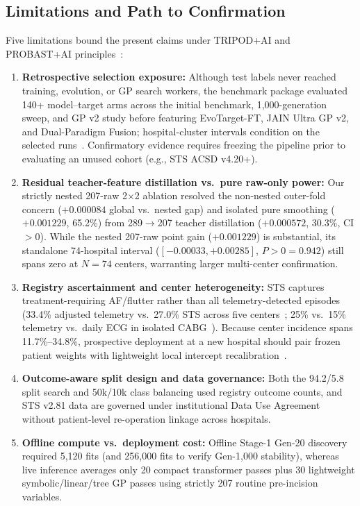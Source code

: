 \subsection{Limitations and Path to Confirmation}
Five limitations bound the present claims under TRIPOD+AI and PROBAST+AI principles~\cite{collins2024tripodai,moons2025probastai}:
\begin{enumerate}
  \item \textbf{Retrospective selection exposure:} Although test labels never reached training, evolution, or GP search workers, the benchmark package evaluated 140+ model--target arms across the initial benchmark, 1,000-generation sweep, and GP v2 study before featuring EvoTarget-FT, JAIN Ultra GP v2, and Dual-Paradigm Fusion; hospital-cluster intervals condition on the selected runs~\cite{dwork2015reusable}. Confirmatory evidence requires freezing the pipeline prior to evaluating an unused cohort (e.g., STS ACSD v4.20+).
  \item \textbf{Residual teacher-feature distillation vs.\ pure raw-only power:} Our strictly nested 207-raw 2$\times$2 ablation resolved the non-nested outer-fold concern ($+0.000084$ global vs.\ nested gap) and isolated pure smoothing ($+0.001229$, 65.2\%) from 289$\to$207 teacher distillation ($+0.000572$, 30.3\%, CI $>0$). While the nested 207-raw point gain ($+0.001229$) is substantial, its standalone 74-hospital interval ($[-0.00033, +0.00285]$, $P>0=0.942$) still spans zero at $N=74$ centers, warranting larger multi-center confirmation.
  \item \textbf{Registry ascertainment and center heterogeneity:} STS  captures treatment-requiring AF/flutter rather than all telemetry-detected episodes (33.4\% adjusted telemetry vs.\ 27.0\% STS across five centers~\cite{filardo2017telemetry,filardo2020telemetry}; 25\% vs.\ 15\% telemetry vs.\ daily ECG in isolated CABG~\cite{perezgrovas2023jaha}). Because center incidence spans 11.7\%--34.8\%, prospective deployment at a new hospital should pair frozen patient weights with lightweight local intercept recalibration~\cite{steyerberg2016prediction,riley2019external,vancalster2019calibration}.
  \item \textbf{Outcome-aware split design and data governance:} Both the 94.2/5.8 split search and 50k/10k class balancing used registry outcome counts, and STS v2.81 data are governed under institutional Data Use Agreement without patient-level re-operation linkage across hospitals.
  \item \textbf{Offline compute vs.\ deployment cost:} Offline Stage-1 Gen-20 discovery required 5,120 fits (and 256,000 fits to verify Gen-1,000 stability), whereas live inference averages only 20 compact transformer passes plus 30 lightweight symbolic/linear/tree GP passes using strictly 207 routine pre-incision variables.
\end{enumerate}

